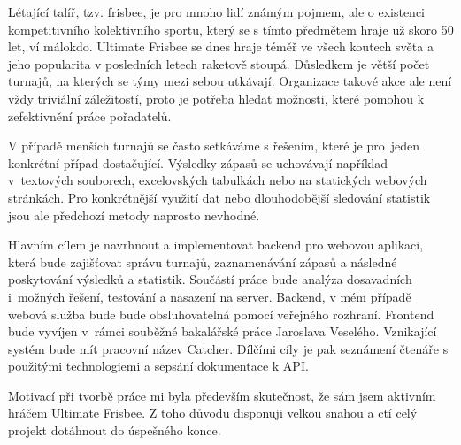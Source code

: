 \begin{introduction}
 Létající talíř, tzv. frisbee, je pro mnoho lidí známým pojmem, ale o existenci kompetitivního kolektivního sportu,
 který se s tímto předmětem hraje už skoro 50 let, ví málokdo. Ultimate Frisbee se dnes hraje téměř
 ve všech koutech světa a jeho popularita v posledních letech raketově stoupá. Důsledkem je větší počet turnajů, na kterých se týmy mezi sebou utkávají.
 Organizace takové akce ale není vždy triviální záležitostí, proto je potřeba hledat možnosti, které pomohou k zefektivnění práce pořadatelů.
 
 V případě menších turnajů se často setkáváme s řešením, které je pro~jeden konkrétní případ dostačující.
 Výsledky zápasů se uchovávají například v~textových souborech, excelovských tabulkách nebo na statických webových stránkách.
 Pro konkrétnější využití dat nebo dlouhodobější sledování statistik jsou ale předchozí metody naprosto nevhodné.
 
 
 Hlavním cílem je navrhnout a implementovat backend pro webovou aplikaci, která bude zajišťovat správu turnajů, zaznamenávání
 zápasů a následné poskytování výsledků a statistik. Sou\-částí práce bude analýza dosavadních
 i~možných řešení, testování a nasazení na server. Backend, v mém případě webová služba bude bude obsluhovatelná
 pomocí veřejného rozhraní. Frontend bude vyvíjen v~rámci souběžné bakalářské práce Jaroslava Veselého.
 Vznikající systém bude mít pracovní název Catcher. Dílčími cíly je pak seznámení čtenáře s použitými technologiemi
 a sepsání dokumentace k API.
 
 Motivací při tvorbě práce mi byla především skutečnost, že sám jsem aktivním hráčem Ultimate Frisbee.
 Z toho důvodu disponuji velkou snahou a ctí celý projekt dotáhnout do úspešného konce.
\end{introduction}
 
 
